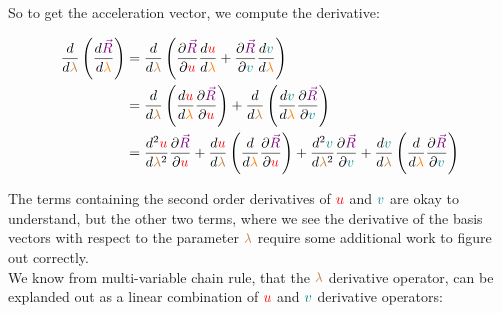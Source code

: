 So to get the acceleration vector, we compute the derivative:

\begin{align*}
    \frac{d}{d\begingroup\color{brown}\lambda\endgroup}\left(\frac{d\begingroup\color{violet}\vec{R}\endgroup}{d\begingroup\color{orange}\lambda\endgroup}\right) &=
    \frac{d}{d\begingroup\color{brown}\lambda\endgroup}\left(\frac{\partial \begingroup\color{violet}\vec{R}\endgroup}{\partial \begingroup\color{red}u\endgroup} \frac{d\begingroup\color{red}u\endgroup}{d\begingroup\color{orange}\lambda\endgroup}
    + \frac{\partial \begingroup\color{violet}\vec{R}\endgroup}{\partial \begingroup\color{teal}v\endgroup} \frac{d\begingroup\color{teal}v\endgroup}{d\begingroup\color{orange}\lambda\endgroup}\right)\\
    &= \frac{d}{d\begingroup\color{brown}\lambda\endgroup}\left(\frac{d\begingroup\color{red}u\endgroup}{d\begingroup\color{orange}\lambda\endgroup} \frac{\partial \begingroup\color{violet}\vec{R}\endgroup}{\partial \begingroup\color{red}u\endgroup}\right)
    + \frac{d}{d\begingroup\color{brown}\lambda\endgroup}\left(\frac{d\begingroup\color{teal}v\endgroup}{d\begingroup\color{orange}\lambda\endgroup} \frac{\partial \begingroup\color{violet}\vec{R}\endgroup}{\partial \begingroup\color{teal}v\endgroup}\right)\\
    &= \frac{d^2 \begingroup\color{red}u\endgroup}{d\begingroup\color{brown}\lambda\endgroup^2}\frac{\partial \begingroup\color{violet}\vec{R}\endgroup}{\partial \begingroup\color{red}u\endgroup} 
    + \frac{d \begingroup\color{red}u\endgroup}{d\begingroup\color{brown}\lambda\endgroup} \left(\frac{d}{d\begingroup\color{orange}\lambda\endgroup} \frac{\partial \begingroup\color{violet}\vec{R}\endgroup}{\partial \begingroup\color{red}u\endgroup}\right)
    + \frac{d^2 \begingroup\color{teal}v\endgroup}{d\begingroup\color{brown}\lambda\endgroup^2}\frac{\partial \begingroup\color{violet}\vec{R}\endgroup}{\partial \begingroup\color{teal}v\endgroup} 
    + \frac{d \begingroup\color{teal}v\endgroup}{d\begingroup\color{brown}\lambda\endgroup} \left(\frac{d}{d\begingroup\color{orange}\lambda\endgroup} \frac{\partial \begingroup\color{violet}\vec{R}\endgroup}{\partial \begingroup\color{teal}v\endgroup}\right)
\end{align*}

The terms containing the second order derivatives of $\color{red}u$ and $\color{teal}v$ are okay to understand, but the other two terms, where we see the derivative
of the basis vectors with respect to the parameter $\color{brown}\lambda$ require some additional work to figure out correctly.\\
We know from multi-variable chain rule, that the $\color{brown}\lambda$ derivative operator, can be explanded out as a linear combination of 
$\color{red}u$ and $\color{teal}v$ derivative operators:

